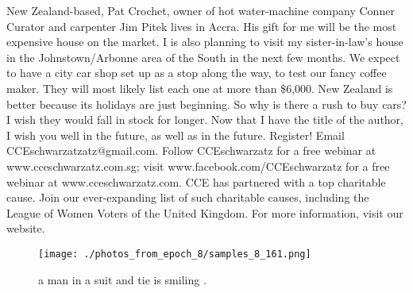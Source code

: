 \documentclass{article}%
\begin{document}
New Zealand{-}based, Pat Crochet, owner of hot water{-}machine company Conner Curator and carpenter Jim Pitek lives in Accra. His gift for me will be the most expensive house on the market.\newline%
I is also planning to visit my sister{-}in{-}law's house in the Johnstown/Arbonne area of the South in the next few months. We expect to have a city car shop set up as a stop along the way, to test our fancy coffee maker. They will most likely list each one at more than \$6,000.\newline%
New Zealand is better because its holidays are just beginning. So why is there a rush to buy cars? I wish they would fall in stock for longer.\newline%
Now that I have the title of the author, I wish you well in the future, as well as in the future.\newline%
Register! Email CCEschwarzatzatz@gmail.com.\newline%
Follow CCEschwarzatz for a free webinar at www.cceschwarzatz.com.sg; visit www.facebook.com/CCEschwarzatz for a free webinar at www.cceschwarzatz.com.\newline%
CCE has partnered with a top charitable cause. Join our ever{-}expanding list of such charitable causes, including the League of Women Voters of the United Kingdom. For more information, visit our website.\newline%

%


\begin{figure}[h!]%
\centering%
\texttt{[image: ./photos\_from\_epoch\_8/samples\_8\_161.png]}%
\caption{a man in a suit and tie is smiling .}%
\end{figure}

%
\end{document}

